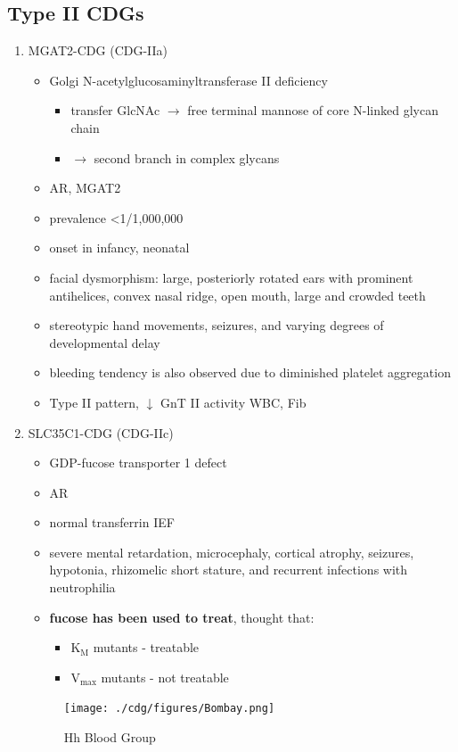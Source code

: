 \documentclass{scrartcl}
\begin{document}
\subsection{Type II CDGs}
\label{sec:orgbe18410}

\begin{enumerate}
\item MGAT2-CDG (CDG-IIa)
\label{sec:org02e0732}
\begin{itemize}
\item Golgi N-acetylglucosaminyltransferase II deficiency
\begin{itemize}
\item transfer GlcNAc \(\to\) free terminal mannose of core N-linked glycan chain
\item \(\to\) second branch in complex glycans
\end{itemize}
\item AR, MGAT2
\item prevalence \textless{}1/1,000,000
\item onset in infancy, neonatal
\item facial dysmorphism: large, posteriorly rotated ears with prominent
antihelices, convex nasal ridge, open mouth, large and crowded
teeth
\item stereotypic hand movements, seizures, and varying degrees of
developmental delay
\item bleeding tendency is also observed due to diminished platelet
aggregation
\item Type II pattern, \(\downarrow\) GnT II activity WBC, Fib
\end{itemize}

\item SLC35C1-CDG (CDG-IIc)
\label{sec:orgfabed4c}
\begin{itemize}
\item GDP-fucose transporter 1	defect
\item AR
\item normal transferrin IEF
\item severe mental retardation, microcephaly, cortical atrophy, seizures,
hypotonia, rhizomelic short stature, and recurrent infections with
neutrophilia
\item \textbf{fucose has been used to treat}, thought that:
\begin{itemize}
\item K\(_{\text{M}}\) mutants - treatable
\item V\(_{\text{max}}\) mutants - not treatable
\end{itemize}
\end{itemize}

\begin{figure}[htbp]
\centering
\texttt{[image: ./cdg/figures/Bombay.png]}
\caption[Hh]{\label{fig:orgbb9c5b3}
Hh Blood Group}
\end{figure}
\end{enumerate}
\end{document}
